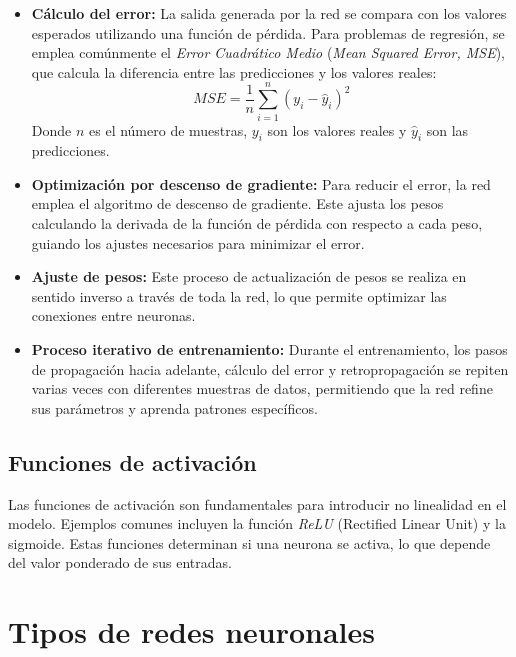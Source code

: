 \begin{itemize}
	\item \textbf{Cálculo del error:} La salida generada por la red se compara con los valores esperados utilizando una función de pérdida. Para problemas de regresión, se emplea comúnmente el \textit{Error Cuadrático Medio} (\textit{Mean Squared Error, MSE}), que calcula la diferencia entre las predicciones y los valores reales:
	\begin{equation}
		\label{eq:mse} %
		MSE = \frac{1}{n} \sum_{i=1}^{n} (y_i - \hat{y}_i)^2
	\end{equation}
	Donde $n$ es el número de muestras, $y_i$ son los valores reales y $\hat{y}_i$ son las predicciones.
	
	\item \textbf{Optimización por descenso de gradiente:} Para reducir el error, la red emplea el algoritmo de descenso de gradiente. Este ajusta los pesos calculando la derivada de la función de pérdida con respecto a cada peso, guiando los ajustes necesarios para minimizar el error.  
	
	\item \textbf{Ajuste de pesos:} Este proceso de actualización de pesos se realiza en sentido inverso a través de toda la red, lo que permite optimizar las conexiones entre neuronas.  
	
	\item \textbf{Proceso iterativo de entrenamiento:} Durante el entrenamiento, los pasos de propagación hacia adelante, cálculo del error y retropropagación se repiten varias veces con diferentes muestras de datos, permitiendo que la red refine sus parámetros y aprenda patrones específicos.
\end{itemize}


\subsection{Funciones de activación}
Las funciones de activación son fundamentales para introducir no linealidad en el modelo. Ejemplos comunes incluyen la función \textit{ReLU} (Rectified Linear Unit) y la sigmoide. Estas funciones determinan si una neurona se activa, lo que depende del valor ponderado de sus entradas.


\section{Tipos de redes neuronales}

